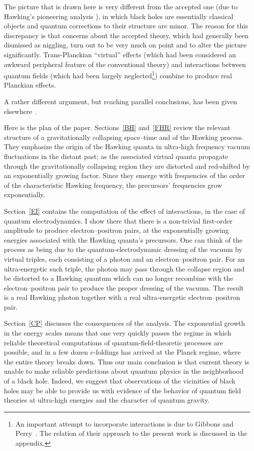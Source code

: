 \documentclass[11pt]{article}
\begin{document}
The picture that is drawn here is very different from the accepted one (due to
Hawking's pioneering analysis \cite{Hawking:1974,Hawking:1975,Helfer:2003}), 
in which black holes are essentially classical objects and quantum corrections
to their structure are minor.  The reason for this discrepancy is that concerns
about the accepted theory, which had generally been dismissed as niggling, turn
out to be very much on point and to alter the picture significantly.
Trans-Planckian ``virtual'' effects (which had been considered an awkward
peripheral feature of the conventional theory) and interactions between quantum
fields (which had been largely neglected\footnote{An important attempt to
incorporate interactions is due to Gibbons and Perry~\cite{GP:1976}.  The
relation of their approach to the present work is discussed in the appendix.})
combine to produce real Planckian effects.

A rather different argument, but reaching parallel conclusions, has been given
elsewhere~\cite{Helfer:2004}.

Here is the plan of the paper.  Sections~\ref{BH} and~\ref{FHR} review the
relevant structure of a gravitationally collapsing space--time and of the
Hawking process.  They emphasize the origin of the Hawking quanta in ultra-high
frequency vacuum fluctuations in the distant past; as the associated virtual
quanta propagate through the gravitationally collapsing region they are
distorted and red-shifted by an exponentially growing factor.  Since they
emerge with frequencies of the order of the characteristic Hawking frequency,
the precursors' frequencies grow exponentially.  

Section~\ref{EI} contains the computation of the effect of interactions, in the
case of quantum electrodynamics.  I show there that there is a non-trivial
first-order amplitude to produce  electron--positron pairs, at the
exponentially growing energies associated with the Hawking quanta's
precursors.  One can think of the process as being due to the
quantum-electrodynamic dressing of the vacuum by virtual triples, each
consisting of a photon and an electron--positron pair.  For an ultra-energetic
such triple, the photon may pass through the collapse region and be distorted
to a Hawking quantum which can no longer recombine with the electron--positron
pair to produce the proper dressing of the vacuum.  The result is a real
Hawking photon together with a real ultra-energetic electron--positron pair.

Section~\ref{CP} discusses the consequences of the analysis.  The exponential
growth in the energy scales means that one very quickly passes the regime in
which reliable theoretical computations of quantum-field-theoretic processes
are possible, and in a few dozen $e$-foldings has arrived at the Planck regime,
where the entire theory breaks down.  Thus our main conclusion is that current
theory is unable to make reliable predictions about quantum physics in the
neighborhood of a black hole.  Indeed, we suggest that observations of the
vicinities of black holes may be able to provide us with evidence of the
behavior of quantum field theories at ultra-high energies and the character of
quantum gravity.
\end{document}
